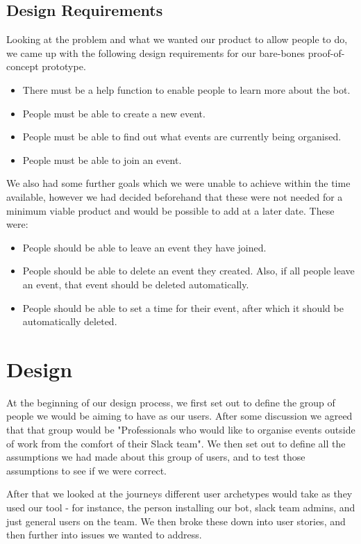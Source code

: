 \documentclass[12pt]{report}
\begin{document}
\subsection{Design Requirements}\label{desreqs}
Looking at the problem and what we wanted our product to allow people to do, we came up with the following design requirements for our bare-bones proof-of-concept prototype.

\begin{itemize}
	\item There must be a help function to enable people to learn more about the bot.
	\item People must be able to create a new event.
	\item People must be able to find out what events are currently being organised.
	\item People must be able to join an event.
\end{itemize}

We also had some further goals which we were unable to achieve within the time available, however we had decided beforehand that these were not needed for a minimum viable product and would be possible to add at a later date. These were:

\begin{itemize}
	\item People should be able to leave an event they have joined.
	\item People should be able to delete an event they created. Also, if all people leave an event, that event should be deleted automatically.
	\item People should be able to set a time for their event, after which it should be automatically deleted.
\end{itemize}


\section{Design}\label{design}
At the beginning of our design process, we first set out to define the group of people we would be aiming to have as our users. After some discussion we agreed that that group would be "Professionals who would like to organise events outside of work from the comfort of their Slack team". We then set out to define all the assumptions we had made about this group of users, and to test those assumptions to see if we were correct.

After that we looked at the journeys different user archetypes would take as they used our tool - for instance, the person installing our bot, slack team admins, and just general users on the team. We then broke these down into user stories, and then further into issues we wanted to address.
\end{document}
